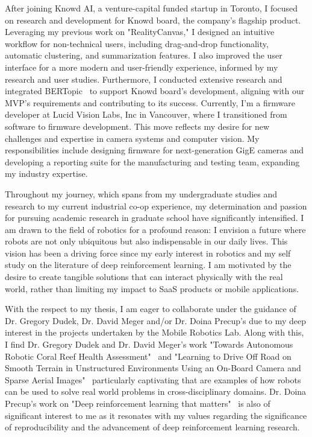\documentclass{article}
\begin{document}
After joining Knowd AI, a venture-capital funded startup in Toronto, 
I focused on research and development for Knowd board, the company's flagship product.
Leveraging my previous work on "RealityCanvas," I designed an intuitive workflow for non-technical users, 
including drag-and-drop functionality, automatic clustering, and summarization features. 
I also improved the user interface for a more modern and user-friendly experience, 
informed by my research and user studies.
Furthermore, I conducted extensive research and integrated 
BERTopic~\cite{BERT} to support Knowd board's development, aligning 
with our MVP's requirements and contributing to its success. 
Currently, I'm a firmware developer at Lucid Vision Labs, Inc in Vancouver, 
where I transitioned from software to firmware development. This move reflects 
my desire for new challenges and expertise in camera systems and computer vision. 
My responsibilities include designing firmware for next-generation GigE cameras and 
developing a reporting suite for the manufacturing and testing team, expanding my industry expertise.



Throughout my journey, which spans from my undergraduate studies and research to my current 
industrial co-op experience, my determination and passion for pursuing academic research in graduate school 
have significantly intensified. I am drawn to the field of robotics for a profound reason: I envision a future 
where robots are not only ubiquitous but also indispensable in our daily lives. This vision has been a 
driving force since my early interest in robotics and my self study on the literature of deep reinforcement 
learning. I am motivated by the desire to create tangible 
solutions that can interact physically with the real world, rather than 
limiting my impact to SaaS products or mobile applications.


With the respect to my thesis, I am eager to collaborate under the guidance of 
Dr. Gregory Dudek, Dr. David Meger and/or Dr. Doina Precup's due to my deep interest in the projects undertaken by 
the Mobile Robotics Lab. Along with this, I find Dr. Gregory Dudek
and Dr. David Meger's work "Towards Autonomous Robotic Coral Reef Health Assessment"~\cite{manderson2016towards}
and "Learning to Drive Off Road on Smooth Terrain in Unstructured Environments Using an On-Board Camera and Sparse Aerial Images"~\cite{manderson2020learning}
particularly captivating that are examples of how robots can be used to solve real world problems in cross-disciplinary domains.
Dr. Doina Precup's work on "Deep reinforcement learning that matters"~\cite{henderson2018deep} is also of 
significant interest to me as it resonates with my values regarding the significance of reproducibility 
and the advancement of deep reinforcement learning research.
\end{document}
